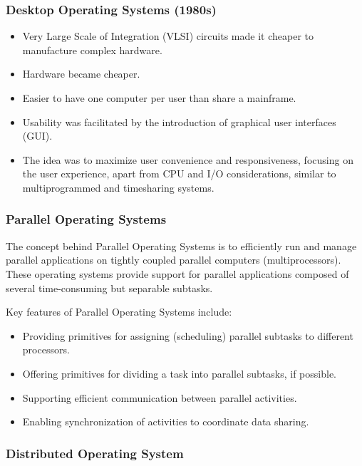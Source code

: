 \documentclass[11pt]{article}
\theoremstyle{definition}
\begin{document}
   \subsubsection{Desktop Operating Systems (1980s)}
    \begin{itemize}
        \item Very Large Scale of Integration (VLSI) circuits made it cheaper to manufacture complex hardware.
        \item Hardware became cheaper.
        \item Easier to have one computer per user than share a mainframe.
        \item Usability was facilitated by the introduction of graphical user interfaces (GUI).
        \item The idea was to maximize user convenience and responsiveness, focusing on the user experience, apart from CPU and I/O considerations, similar to multiprogrammed and timesharing systems.
    \end{itemize}
    \subsubsection{Parallel Operating Systems}
    
    The concept behind Parallel Operating Systems is to efficiently run and manage parallel applications on tightly coupled parallel computers (multiprocessors). These operating systems provide support for parallel applications composed of several time-consuming but separable subtasks.

    Key features of Parallel Operating Systems include:

    \begin{itemize}
        \item Providing primitives for assigning (scheduling) parallel subtasks to different processors.
        \item Offering primitives for dividing a task into parallel subtasks, if possible.
        \item Supporting efficient communication between parallel activities.
        \item Enabling synchronization of activities to coordinate data sharing.
    \end{itemize}
    \subsubsection{Distributed Operating System}
    
\end{document}
